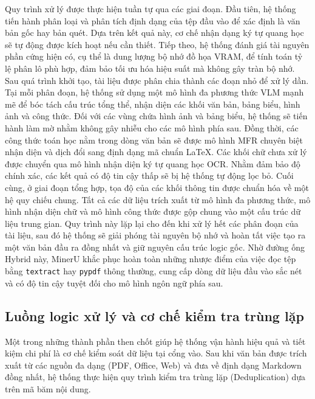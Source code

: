 \indent Quy trình xử lý được thực hiện tuần tự qua các giai đoạn. Đầu tiên, hệ thống tiến hành phân loại và phân tích định dạng của tệp đầu vào để xác định là văn bản gốc hay bản quét. Dựa trên kết quả này, cơ chế nhận dạng ký tự quang học sẽ tự động được kích hoạt nếu cần thiết. Tiếp theo, hệ thống đánh giá tài nguyên phần cứng hiện có, cụ thể là dung lượng bộ nhớ đồ họa VRAM, để tính toán tỷ lệ phân lô phù hợp, đảm bảo tối ưu hóa hiệu suất mà không gây tràn bộ nhớ. Sau quá trình khởi tạo, tài liệu được phân chia thành các đoạn nhỏ để xử lý dần. Tại mỗi phân đoạn, hệ thống sử dụng một mô hình đa phương thức VLM mạnh mẽ để bóc tách cấu trúc tổng thể, nhận diện các khối văn bản, bảng biểu, hình ảnh và công thức. Đối với các vùng chứa hình ảnh và bảng biểu, hệ thống sẽ tiến hành làm mờ nhằm không gây nhiễu cho các mô hình phía sau. Đồng thời, các công thức toán học nằm trong dòng văn bản sẽ được mô hình MFR chuyên biệt nhận diện và dịch đổi sang định dạng mã chuẩn LaTeX. Các khối chữ chưa xử lý được chuyển qua mô hình nhận diện ký tự quang học OCR. Nhằm đảm bảo độ chính xác, các kết quả có độ tin cậy thấp sẽ bị hệ thống tự động lọc bỏ. Cuối cùng, ở giai đoạn tổng hợp, tọa độ của các khối thông tin được chuẩn hóa về một hệ quy chiếu chung. Tất cả các dữ liệu trích xuất từ mô hình đa phương thức, mô hình nhận diện chữ và mô hình công thức được gộp chung vào một cấu trúc dữ liệu trung gian. Quy trình này lặp lại cho đến khi xử lý hết các phân đoạn của tài liệu, sau đó hệ thống sẽ giải phóng tài nguyên bộ nhớ và hoàn tất việc tạo ra một văn bản đầu ra đồng nhất và giữ nguyên cấu trúc logic gốc. Nhờ đường ống Hybrid này, MinerU khắc phục hoàn toàn những nhược điểm của việc đọc tệp bằng \texttt{textract} hay \texttt{pypdf} thông thường, cung cấp dòng dữ liệu đầu vào sắc nét và có độ tin cậy tuyệt đối cho mô hình ngôn ngữ phía sau.

\subsection{Luồng logic xử lý và cơ chế kiểm tra trùng lặp}

\indent Một trong những thành phần then chốt giúp hệ thống vận hành hiệu quả và tiết kiệm chi phí là cơ chế kiểm soát dữ liệu tại cổng vào. Sau khi văn bản được trích xuất từ các nguồn đa dạng (PDF, Office, Web) và đưa về định dạng Markdown đồng nhất, hệ thống thực hiện quy trình kiểm tra trùng lặp (Deduplication) dựa trên mã băm nội dung.

